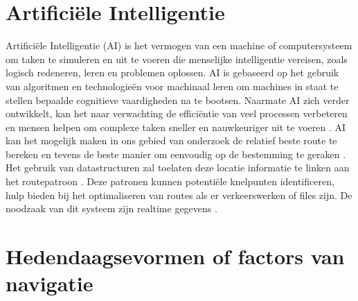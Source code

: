 \section{Artificiële Intelligentie}
\label{sec:artificiële intelligentie}
Artificiële Intelligentie (AI) is het vermogen van een machine of computersysteem om taken te simuleren en uit te voeren die menselijke intelligentie vereisen, zoals logisch redeneren, leren en problemen oplossen. AI is gebaseerd op het gebruik van algoritmen en technologieën voor machinaal leren om machines in staat te stellen bepaalde cognitieve vaardigheden na te bootsen. Naarmate AI zich verder ontwikkelt, kan het naar verwachting de efficiëntie van veel processen verbeteren en mensen helpen om complexe taken sneller en nauwkeuriger uit te voeren \autocite{Sabouret2020}. AI kan het mogelijk maken in ons gebied van onderzoek de relatief beste route te bereken en tevens de beste manier om eenvoudig op de bestemming te geraken \autocite{Soni2023a}. Het gebruik van datastructuren zal toelaten deze locatie informatie te linken aan het routepatroon \autocite{Ruta2010}. Deze patronen kunnen potentiële knelpunten identificeren, hulp bieden bij het optimaliseren van routes als er verkeerswerken of files zijn. De noodzaak van dit systeem zijn realtime gegevens \autocite{Ciravegna2018}.
\section{Hedendaagsevormen of factors van navigatie}
\label{sec:literatuuroverzicht}
